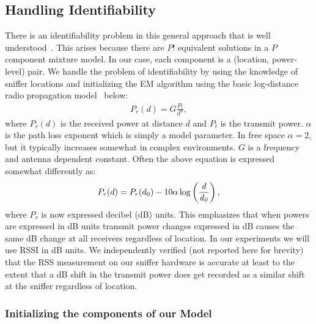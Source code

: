 \subsection{Handling Identifiability}
\label{subsec:handlingidentifiabilityinourmodel}

There is an identifiability problem in this general approach that is well understood~\cite{Bishop:2006:PRM:1162264}. This arises because there are $P!$ equivalent solutions
in a $P$ component mixture model. In our case,
each component is a (location,
power-level) pair. 
We handle the problem of identifiability 
by using the knowledge of sniffer locations and initializing the EM algorithm
using the basic log-distance radio propagation model~\cite{Rappaport:2001:WCP:559977, Molkdar91} below:
\begin{align}
P_r(d) = G\frac{P_t}{d^\alpha},
\end{align}
where $P_r(d)$ is the received power at distance $d$ and $P_t$ is the transmit power.
$\alpha$ is the path loss exponent which is simply a model parameter. 
In free space $\alpha =2$, but it typically increases somewhat in complex 
environments. $G$ is a frequency and antenna dependent constant. 
Often the above equation is expressed somewhat differently as: 
\begin{align}
P_r(d) = P_r({d_0}) - 10\alpha\log\left(\frac {\it d} {\it d_{0}}\right)
	\label{eqn:pathloss_1},
\end{align}
where $P_r$ is now expressed decibel (dB) units. This emphasizes that when powers 
are expressed in dB units
transmit power changes expressed in dB causes the same dB change at all receivers
regardless of location. In our experiments we will use RSSI in dB units. We independently
verified (not reported here for brevity) that the RSS measurement on our sniffer hardware is accurate at least to the extent
that a dB shift in the transmit power does get recorded as a similar
shift at the sniffer regardless of location.

\subsubsection{Initializing the components of our Model}
\label{subsubsec:initializingthecomponentsofourmodel}

